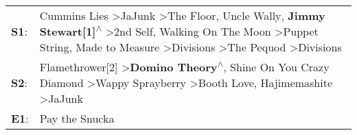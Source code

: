 \begin{supertabular}{p{0.03\textwidth}p{0.92\textwidth}}
 \textbf{S1}:  &  Cummins Lies\textsuperscript{} \textgreater \enspace JaJunk\textsuperscript{} \textgreater \enspace The Floor\textsuperscript{}, \enspace Uncle Wally\textsuperscript{}, \enspace \textbf{Jimmy Stewart[1]\textsuperscript{$\wedge$}} \textgreater \enspace 2nd Self\textsuperscript{}, \enspace Walking On The Moon\textsuperscript{} \textgreater \enspace Puppet String\textsuperscript{}, \enspace Made to Measure\textsuperscript{} \textgreater \enspace Divisions\textsuperscript{} \textgreater \enspace The Pequod\textsuperscript{} \textgreater \enspace Divisions\textsuperscript{}  \enspace  \\
 \textbf{S2}:  &                                                                                                                                                                                                                             Flamethrower[2]\textsuperscript{} \textgreater \enspace \textbf{Domino Theory\textsuperscript{$\wedge$}}, \enspace Shine On You Crazy Diamond\textsuperscript{} \textgreater \enspace Wappy Sprayberry\textsuperscript{} \textgreater \enspace Booth Love\textsuperscript{}, \enspace Hajimemashite\textsuperscript{} \textgreater \enspace JaJunk\textsuperscript{}  \enspace  \\
 \textbf{E1}:  &                                                                                                                                                                                                                                                                                                                                                                                                                                                                                                                                                                 Pay the Snucka\textsuperscript{}  \enspace  \\
\end{supertabular}
